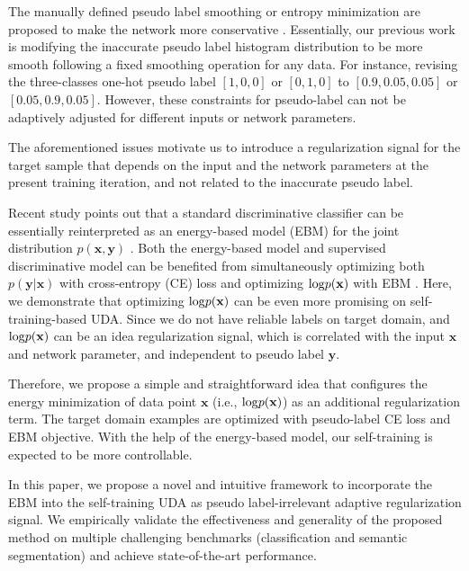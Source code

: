 \documentclass[a4paper,conference]{IEEEtran}
\theoremstyle{plain}%
\begin{document}
The manually defined pseudo label smoothing or entropy minimization are proposed to make the network more conservative \cite{zou2019confidence}. Essentially, our previous work \cite{zou2019confidence} is modifying the inaccurate pseudo label histogram distribution to be more smooth following a fixed smoothing operation for any data. For instance, revising the three-classes one-hot pseudo label $[1,0,0]$ or $[0,1,0]$ to $[0.9,0.05,0.05]$ or $[0.05,0.9,0.05]$. However, these constraints for pseudo-label can not be adaptively adjusted for different inputs or network parameters.






The aforementioned issues motivate us to introduce a regularization signal for the target sample that depends on the input and the network parameters at the present training iteration, and not related to the inaccurate pseudo label. 

Recent study \cite{grathwohl2019your} points out that a standard discriminative classifier can be essentially reinterpreted as an energy-based model (EBM) for the joint distribution $p(\mathbf{x},\mathbf{y})$ \cite{liu2018dependency,liu2019attention,liu2019permutation,liu2019dependency}. Both the energy-based model and supervised discriminative model can be benefited from simultaneously optimizing both $p(\mathbf{y}|\mathbf{x})$ with cross-entropy (CE) loss and optimizing ${\rm log}p(\mathbf{x})$ with EBM \cite{grathwohl2019your}. Here, we demonstrate that optimizing ${\rm log}p(\mathbf{x})$ can be even more promising on self-training-based UDA. Since we do not have reliable labels on target domain, and ${\rm log}p(\mathbf{x})$ can be an idea regularization signal, which is correlated with the input $\mathbf{x}$ and network parameter, and independent to pseudo label $\mathbf{y}$.  



Therefore, we propose a simple and straightforward idea that configures the energy minimization of data point $\mathbf{x}$ (i.e., ${\rm log}p(\mathbf{x})$) as an additional regularization term. The target domain examples are optimized with pseudo-label CE loss and EBM objective. With the help of the energy-based model, our self-training is expected to be more controllable.%

 

In this paper, we propose a novel and intuitive framework to incorporate the EBM into the self-training UDA as pseudo label-irrelevant adaptive regularization signal. We empirically validate the effectiveness and generality of the proposed method on multiple challenging benchmarks (classification and semantic segmentation) and achieve state-of-the-art performance. 
\end{document}
